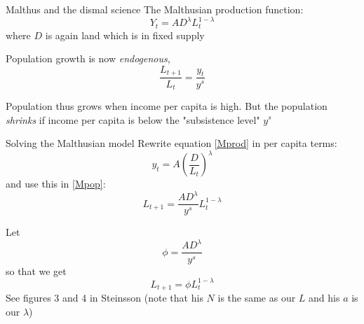 \documentclass[10pt]{beamer}
\begin{document}
\begin{frame}{Malthus and the dismal science}
    The Malthusian production function:
    \begin{equation} \label{Mprod}
        Y_t = A D^\lambda L_t^{1-\lambda}
    \end{equation}
    where $D$ is again land which is in fixed supply\medskip

    Population growth is now \emph{endogenous},
    \begin{equation} \label{Mpop}
        \frac{L_{t+1}}{L_t} = \frac{y_t}{y^s}
    \end{equation}

    Population thus grows when income per capita is high. But the population \emph{shrinks} if income per capita is below the "subsistence level" $y^s$
\end{frame}


\begin{frame}{Solving the Malthusian model}
    Rewrite equation \eqref{Mprod} in per capita terms:
    \begin{equation} \label{M_y}
        y_t = A \left( \frac{D}{L_t} \right)^\lambda
    \end{equation}
    and use this in \eqref{Mpop}:
    \begin{equation} \label{M_L}
        L_{t+1} = \frac{A D^\lambda}{y^s} L_t^{1-\lambda}
    \end{equation}\medskip

    Let
    \begin{equation*}
        \phi = \frac{A D^\lambda}{y^s}
    \end{equation*}
    so that we get
    \[
        L_{t+1} = \phi L_t^{1-\lambda}
    \]
    {\footnotesize See figures 3 and 4 in Steinsson (note that his $N$ is the same as our $L$ and his $a$ is our $\lambda$)}
\end{frame}
\end{document}
